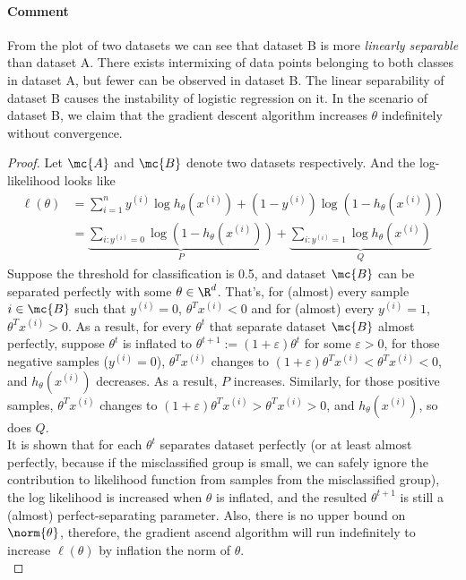 \documentclass[11pt]{article}
\newcommand{\upi}[0]{^{(i)}}
\begin{document}
	\paragraph{Comment} From the plot of two datasets we can see that dataset B is more \emph{linearly separable} than dataset A. There exists intermixing of data points belonging to both classes in dataset A, but fewer can be observed in dataset B. The linear separability of dataset B causes the instability of logistic regression on it. In the scenario of dataset B, we claim that the gradient descent algorithm increases $\theta$ indefinitely without convergence.
	\begin{proof}
		Let $\mc{A}$ and $\mc{B}$ denote two datasets respectively.
		And the log-likelihood looks like
		\begin{align}
			\ell (\theta) &= \sum_{i=1}^{n} y^{(i)} \log h_\theta\left(x^{(i)}\right)+\left(1-y^{(i)}\right) \log \left(1-h_\theta\left(x^{(i)}\right)\right) \\
			&= \underbrace{\sum_{i: y\upi = 0} \log \left(1 - h_\theta(x\upi)\right)}_{P} + 
			\underbrace{\sum_{i: y\upi = 1} \log h_\theta(x\upi)}_{Q}
		\end{align}
		Suppose the threshold for classification is 0.5, and dataset $\mc{B}$ can be separated perfectly with some $\theta \in \R^d$. That's, for (almost) every sample $i \in \mc{B}$ such that $y\upi = 0$, $\theta^T x\upi < 0$ and for (almost) every $y\upi = 1$, $\theta^T x\upi > 0$. As a result, for every $\theta^t$ that separate dataset $\mc{B}$ almost perfectly, suppose $\theta^t$ is inflated to $\theta^{t+1} := (1 + \varepsilon) \theta^t$ for some $\varepsilon > 0$, for those negative samples ($y\upi = 0$), $\theta^T x\upi$ changes to $(1 + \varepsilon) \theta^T x\upi < \theta^T x\upi < 0$, and $h_\theta(x\upi)$ decreases. As a result, $P$ increases. Similarly, for those positive samples, $\theta^T x\upi$ changes to $(1 + \varepsilon) \theta^T x\upi > \theta^T x\upi > 0$, and $h_\theta(x\upi)$, so does $Q$.\\
		It is shown that for each $\theta^t$ separates dataset perfectly (or at least almost perfectly, because if the misclassified group is small, we can safely ignore the contribution to likelihood function from samples from the misclassified group), the log likelihood is increased when $\theta$ is inflated, and the resulted $\theta^{t+1}$ is still a (almost) perfect-separating parameter. Also, there is no upper bound on $\norm{\theta}$, therefore, the gradient ascend algorithm will run indefinitely to increase $\ell(\theta)$ by inflation the norm of $\theta$.\\

\end{proof}
\end{document}
